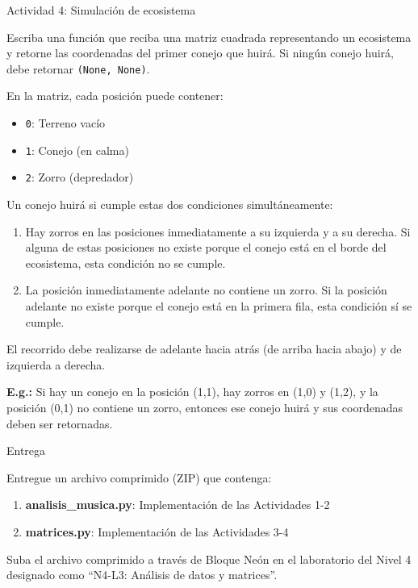 \documentclass{ip-lab}
\begin{document}
\pagebreak

\begin{sectionbox}{Actividad 4: Simulación de ecosistema}

Escriba una función que reciba una matriz cuadrada representando un ecosistema y retorne las coordenadas del primer conejo que huirá. Si ningún conejo huirá, debe retornar \texttt{(None, None)}.

En la matriz, cada posición puede contener:
\begin{itemize}
    \item \texttt{0}: Terreno vacío
    \item \texttt{1}: Conejo (en calma)
    \item \texttt{2}: Zorro (depredador)
\end{itemize}

Un conejo huirá si cumple estas dos condiciones simultáneamente:
\begin{enumerate}
    \item Hay zorros en las posiciones inmediatamente a su izquierda y a su derecha. Si alguna de estas posiciones no existe porque el conejo está en el borde del ecosistema, esta condición no se cumple.
    \item La posición inmediatamente adelante no contiene un zorro. Si la posición adelante no existe porque el conejo está en la primera fila, esta condición sí se cumple.
\end{enumerate}

El recorrido debe realizarse de adelante hacia atrás (de arriba hacia abajo) y de izquierda a derecha.

\textbf{E.g.:} Si hay un conejo en la posición (1,1), hay zorros en (1,0) y (1,2), y la posición (0,1) no contiene un zorro, entonces ese conejo huirá y sus coordenadas deben ser retornadas.

\end{sectionbox}

\pagebreak

\begin{sectionbox}{Entrega}

Entregue un archivo comprimido (ZIP) que contenga:

\begin{enumerate}
    \item \textbf{analisis\_musica.py}: Implementación de las Actividades 1-2
    \item \textbf{matrices.py}: Implementación de las Actividades 3-4
\end{enumerate}

Suba el archivo comprimido a través de Bloque Neón en el laboratorio del Nivel 4 designado como ``N4-L3: Análisis de datos y matrices''.

\end{sectionbox}
\end{document}

